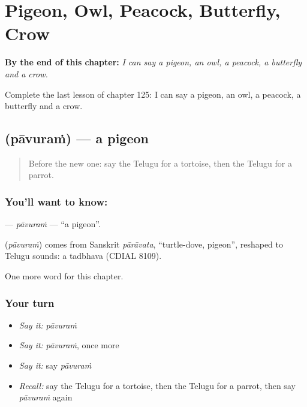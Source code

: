 
\chapter{Pigeon, Owl, Peacock, Butterfly, Crow}
\label{ch:te-pigeon-owl-peacock-butterfly-crow}

\begin{chapteropening}
\textbf{By the end of this chapter:} \emph{I can say a pigeon, an owl, a peacock, a butterfly and a crow.}

Complete the last lesson of chapter 125: I can say a pigeon, an owl, a peacock, a butterfly and a crow.
\end{chapteropening}

\section[\texorpdfstring{\te{పావురం} (pāvuraṁ)}{పావురం (pāvuraṁ)}]{ (pāvuraṁ) — a pigeon}

\label{lesson:TE-C125-pavuram}



\begin{quote}
Before the new one: say the Telugu for a tortoise, then the Telugu for a parrot.
\end{quote}

\subsection*{You'll want to know: }
\textbf{} — \emph{pāvuraṁ} — \textquotedblleft{}a pigeon\textquotedblright{}.

\begin{cousinweb}
\textbf{} (\emph{pāvuraṁ}) comes from Sanskrit \emph{pārāvata}, \textquotedblleft{}turtle-dove, pigeon\textquotedblright{}, reshaped to Telugu sounds: a tadbhava (CDIAL 8109).
\end{cousinweb}

\begin{grammarlens}[title={What you've built}]
One more word for this chapter.
\end{grammarlens}

\subsection*{Your turn}
\begin{itemize}
\raggedright
  \item \emph{Say it:} \emph{pāvuraṁ}
  \item \emph{Say it:} \emph{pāvuraṁ}, once more
  \item \emph{Say it:} say \emph{pāvuraṁ}
  \item \emph{Recall:} say the Telugu for a tortoise, then the Telugu for a parrot, then say \emph{pāvuraṁ} again
\end{itemize}

